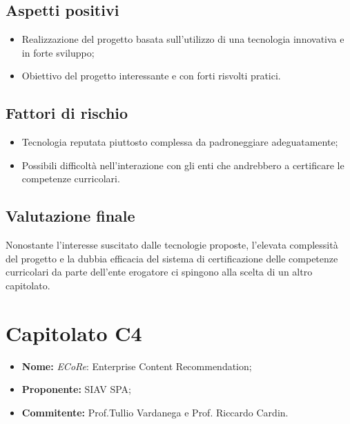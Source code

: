 \documentclass[openany,12pt,a4paper]{report}
\begin{document}
	\subsection{Aspetti positivi}

	\begin{itemize}
		\item Realizzazione del progetto basata sull'utilizzo di una tecnologia innovativa e in forte sviluppo;

		\item Obiettivo del progetto interessante e con forti risvolti pratici.
	\end{itemize}

	\subsection{Fattori di rischio}

	\begin{itemize}
		\item Tecnologia reputata piuttosto complessa da padroneggiare adeguatamente;

		\item Possibili difficoltà nell'interazione con gli enti che andrebbero a certificare le competenze curricolari.
	\end{itemize}

	\subsection{Valutazione finale}

	Nonostante l'interesse suscitato dalle tecnologie proposte, l'elevata complessità del progetto e la dubbia efficacia del sistema di certificazione delle competenze curricolari da parte dell'ente erogatore ci spingono alla scelta di un altro capitolato.


	\section{Capitolato C4}

	\begin{itemize}
		\item \textbf{Nome:} \textit{ECoRe}: Enterprise Content Recommendation;
		\item \textbf{Proponente:} SIAV SPA;
		\item \textbf{Commitente:} Prof.Tullio Vardanega e Prof. Riccardo Cardin.
	\end{itemize}
\end{document}
